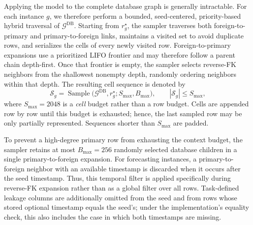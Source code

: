 \documentclass[11pt]{article}
\begin{document}
Applying the model to the complete database graph is generally
intractable.  For each instance \(g\), we therefore perform a bounded,
seed-centered, priority-based hybrid traversal of
\(\mathcal G^{\mathrm{DB}}\).  Starting from \(r_g^\star\), the sampler
traverses both foreign-to-primary and primary-to-foreign links, maintains a
visited set to avoid duplicate rows, and serializes the cells of every
newly visited row.  Foreign-to-primary expansions use a prioritized LIFO
frontier and may therefore follow a parent chain depth-first.  Once that
frontier is empty, the sampler selects reverse-FK neighbors from the
shallowest nonempty depth, randomly ordering neighbors within that depth.
The resulting cell sequence is denoted by
\begin{equation}
    \mathcal S_g
    =
    \operatorname{Sample}
    \bigl(
        \mathcal G^{\mathrm{DB}},r_g^\star;
        S_{\max},B_{\max}
    \bigr),
    \qquad
    |\mathcal S_g|\leq S_{\max},
    \label{eq:context-sample}
\end{equation}
where \(S_{\max}=2048\) is a \emph{cell} budget rather than a row budget.
Cells are appended row by row until this budget is exhausted; hence, the
last sampled row may be only partially represented.  Sequences shorter than
\(S_{\max}\) are padded.

To prevent a high-degree primary row from exhausting the context budget,
the sampler retains at most \(B_{\max}=256\) randomly selected database
children in a single primary-to-foreign expansion.  For forecasting
instances, a primary-to-foreign neighbor with an available timestamp is
discarded when it occurs after the seed timestamp.  Thus, this temporal
filter is applied specifically during reverse-FK expansion rather than as a
global filter over all rows.  Task-defined leakage columns are additionally
omitted from the seed and from rows whose stored optional timestamp equals
the seed's; under the implementation's equality check, this also includes
the case in which both timestamps are missing.
\end{document}
